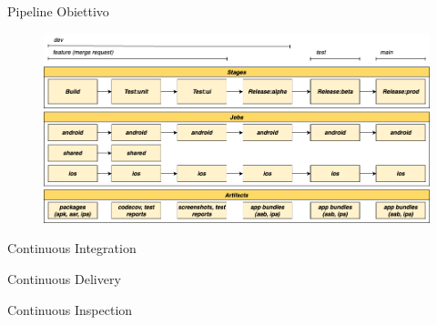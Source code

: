     \begin{frame}{Pipeline Obiettivo}
        \begin{figure}[H]
            \centering
            \includegraphics[width=1\textwidth]{img/tesi-2-Page-12.drawio.png}
        \end{figure}  
    \end{frame}

    \begin{frame}{Continuous Integration}

    \end{frame}

    \begin{frame}{Continuous Delivery}

    \end{frame}

    \begin{frame}{Continuous Inspection}

    \end{frame}
